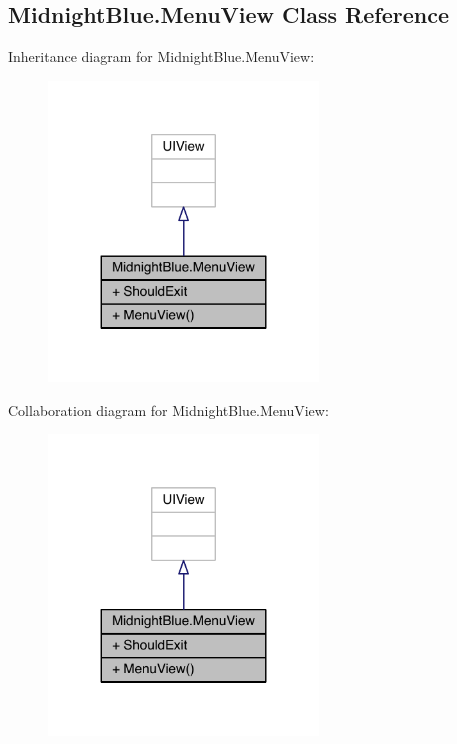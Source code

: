 \hypertarget{class_midnight_blue_1_1_menu_view}{}\subsection{Midnight\+Blue.\+Menu\+View Class Reference}
\label{class_midnight_blue_1_1_menu_view}


Inheritance diagram for Midnight\+Blue.\+Menu\+View\+:\nopagebreak
\begin{figure}[H]
\begin{center}
\leavevmode
\includegraphics[width=203pt]{class_midnight_blue_1_1_menu_view__inherit__graph}
\end{center}
\end{figure}


Collaboration diagram for Midnight\+Blue.\+Menu\+View\+:\nopagebreak
\begin{figure}[H]
\begin{center}
\leavevmode
\includegraphics[width=203pt]{class_midnight_blue_1_1_menu_view__coll__graph}
\end{center}
\end{figure}

